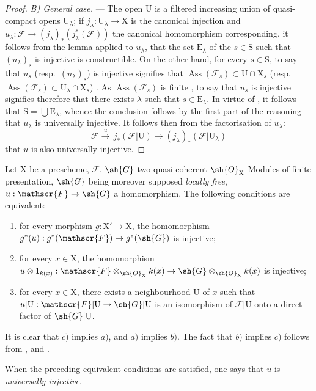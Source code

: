 \begin{proof}
\emph{B) General case.} --- The open $\mathrm{U}$ is a filtered increasing union of quasi-compact opens $\mathrm{U}_\lambda$; if $j_\lambda:\mathrm{U}_\lambda\to\mathrm{X}$ is the canonical injection and $u_\lambda:\mathscr{F}\to(j_\lambda)_*(j_\lambda^*(\mathscr{F}))$ the canonical homomorphism corresponding, it follows from the lemma  applied to $u_\lambda$, that the set $\mathrm{E}_\lambda$ of the $s\in\mathrm{S}$ such that $(u_\lambda)_s$ is injective is constructible.
On the other hand, for every $s\in\mathrm{S}$, to say that $u_s$ (resp.\ $(u_\lambda)_s$) is injective signifies that $\operatorname{Ass}(\mathscr{F}_s)\subset\mathrm{U}\cap\mathrm{X}_s$ (resp.\ $\operatorname{Ass}(\mathscr{F}_s)\subset\mathrm{U}_\lambda\cap\mathrm{X}_s$) .
As $\operatorname{Ass}(\mathscr{F}_s)$ is finite , to say that $u_s$ is injective signifies therefore that there exists $\lambda$ such that $s\in\mathrm{E}_\lambda$.
In virtue of , it follows that $\mathrm{S}=\bigcup\mathrm{E}_\lambda$, whence the conclusion follows by the first part of the reasoning that $u_\lambda$ is universally injective.
It follows then from the factorisation of $u_\lambda$:
\[
  \mathscr{F}\xrightarrow{u}\,j_*(\mathscr{F}|\mathrm{U})\to(j_\lambda)_*(\mathscr{F}|\mathrm{U}_\lambda)
\]
that $u$ is also universally injective.
\end{proof}

\begin{remarks}[11.9.18]
\label{IV.11.9.18}
Let $\mathrm{X}$ be a prescheme, $\mathscr{F}$, $\sh{G}$ two quasi-coherent $\sh{O}_\mathrm{X}$-Modules of finite presentation, $\sh{G}$ being moreover supposed \emph{locally free}, $u:\mathscr{F}\to\sh{G}$ a homomorphism.
The following conditions are equivalent:
\begin{enumerate}[label=\emph{\alph*)}]
  \item for every morphism $g:\mathrm{X}'\to\mathrm{X}$, the homomorphism $g^*(u):g^*(\mathscr{F})\to g^*(\sh{G})$ is injective;
  \item for every $x\in\mathrm{X}$, the homomorphism $u\otimes 1_{k(x)}:\mathscr{F}\otimes_{\sh{O}_{\mathrm{X}}}k(x)\to\sh{G}\otimes_{\sh{O}_\mathrm{X}}k(x)$ is injective;
  \item for every $x\in\mathrm{X}$, there exists a neighbourhood $\mathrm{U}$ of $x$ such that $u|\mathrm{U}:\mathscr{F}|\mathrm{U}\to\sh{G}|\mathrm{U}$ is an isomorphism of $\mathscr{F}|\mathrm{U}$ onto a direct factor of $\sh{G}|\mathrm{U}$.
\end{enumerate}

It is clear that $c)$ implies $a)$, and $a)$ implies $b)$.
The fact that $b)$ implies $c)$ follows from ,  and .

When the preceding equivalent conditions are satisfied, one says that $u$ is \emph{universally injective}.
\end{remarks}

